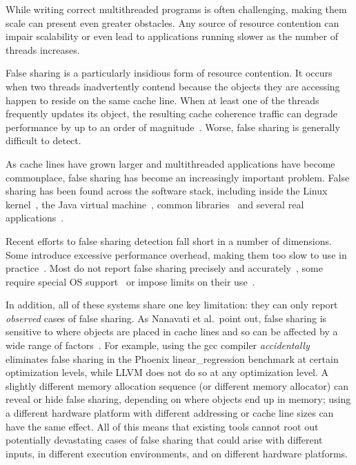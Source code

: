 
\label{sec:intro} 

While writing correct multithreaded programs is often challenging,
making them scale can present even greater obstacles. Any source of
resource contention can impair scalability or even lead to
applications running slower as the number of threads increases.

False sharing is a particularly insidious form of resource contention.
It occurs when two threads inadvertently contend because the objects
they are accessing happen to reside on the same cache line. When at least
one of the threads frequently updates its object, the resulting cache
coherence traffic can degrade performance by up to an order of
magnitude~\cite{falseshareeffect}. Worse, false sharing is generally difficult to detect.

As cache lines have grown larger and multithreaded applications have
become commonplace, false sharing has become an increasingly important
problem. False sharing has been found across the software stack,
including inside the Linux kernel~\cite{OSfalsesharing}, the Java
virtual machine~\cite{JVMfalsesharing}, common
libraries~\cite{libfalsesharing} and several real
applications~\cite{mysql,appfalsesharing}.

Recent efforts to false sharing detection fall short in a number of dimensions. Some introduce excessive performance overhead, making them too slow to use in practice~\cite{falseshare:binaryinstrumentation1,falseshare:binaryinstrumentation2,falseshare:simulator}. Most do not report false sharing precisely and accurately~\cite{falseshare:binaryinstrumentation1,detect:ptu,detect:intel,falseshare:binaryinstrumentation2,DProf,qinzhaodetection}, some require special OS support~\cite{OSdetection} or impose limits on their use~\cite{sheriff}.

In addition, all of these systems share one key limitation: they can
only report \emph{observed} cases of false sharing. As Nanavati et al.\ point out, false sharing is sensitive to where objects are placed in cache lines and so can be affected by a wide range of factors~\cite{OSdetection}. For example, using the gcc compiler \emph{accidentally} eliminates false sharing in the Phoenix linear\_regression benchmark at certain optimization levels, while LLVM does not do so at any optimization level.  A slightly different memory allocation sequence (or different memory allocator) can reveal or hide
false sharing, depending on where objects end up in memory; using a different hardware platform with different addressing or cache line sizes can have the same effect. All of this means that existing tools cannot root out potentially devastating cases of false sharing that could arise with different inputs, in different execution environments, and on different hardware platforms.

